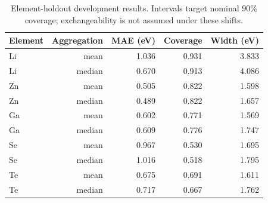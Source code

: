 \begin{table}[htbp]\centering\small
\caption{Element-holdout development results. Intervals target nominal 90\% coverage; exchangeability is not assumed under these shifts.}
\begin{tabular}{lrrrr}
\toprule
Element & Aggregation & MAE (eV) & Coverage & Width (eV) \\
\midrule
Li & mean & 1.036 & 0.931 & 3.833 \\
Li & median & 0.670 & 0.913 & 4.086 \\
Zn & mean & 0.505 & 0.822 & 1.598 \\
Zn & median & 0.489 & 0.822 & 1.657 \\
Ga & mean & 0.602 & 0.771 & 1.569 \\
Ga & median & 0.609 & 0.776 & 1.747 \\
Se & mean & 0.967 & 0.530 & 1.695 \\
Se & median & 1.016 & 0.518 & 1.795 \\
Te & mean & 0.675 & 0.691 & 1.611 \\
Te & median & 0.717 & 0.667 & 1.762 \\
\bottomrule
\end{tabular}\end{table}
